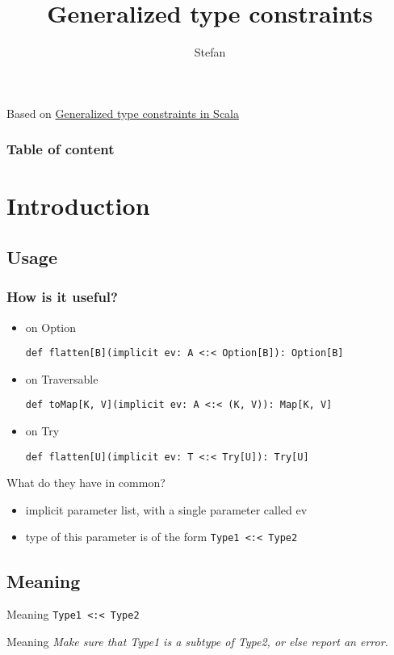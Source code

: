 \documentclass[11pt]{beamer}
\author{Stefan}
\title{Generalized type constraints}
\date{}
\begin{document}
\begin{frame}
\titlepage
Based on \href{http://blog.bruchez.name/2015/11/generalized-type-constraints-in-scala.html}{Generalized type constraints in Scala}
\end{frame}

\begin{frame} 
	\frametitle{Table of content} 
	\tableofcontents 
\end{frame}

\section{Introduction} 
\subsection{Usage}

\begin{frame}[fragile]
\frametitle{How is it useful?}
\begin{itemize}
\item on Option
\begin{lstlisting} 
def flatten[B](implicit ev: A <:< Option[B]): Option[B]
\end{lstlisting} %

\item on Traversable
\begin{lstlisting} 
def toMap[K, V](implicit ev: A <:< (K, V)): Map[K, V]
\end{lstlisting} %

\item on Try
\begin{lstlisting} 
def flatten[U](implicit ev: T <:< Try[U]): Try[U]
\end{lstlisting} 
\end{itemize}
\end{frame}

\begin{frame}{What do they have in common?}
\begin{itemize}
\item implicit parameter list, with a single parameter called ev
\item type of this parameter is of the form \lstinline{Type1 <:< Type2}
\end{itemize}
\end{frame}


\subsection{Meaning}
\begin{frame}[fragile]{Meaning}
\lstinline {Type1 <:< Type2} \newline\newline
\begin{block}{Meaning}
\textit{Make sure that Type1 is a subtype of Type2, or else report an error.}
\end{block}
\end{frame}
\end{document}
